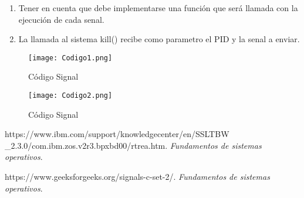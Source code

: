 \documentclass[a4paperx]{article}
\begin{document}
\begin{enumerate}
\begin{enumerate}
\item{Tener en cuenta que debe implementarse una funci\'on que ser\'a llamada con la ejecuci\'on de cada senal.}\\

\item{La llamada al sistema kill() recibe como parametro el PID y la senal
a enviar}.\\


\end{enumerate}

\begin{figure}[H]
\centering
\texttt{[image: Codigo1.png]}
\caption{C\'odigo Signal}
\end{figure}

\begin{figure}[H]
\centering
\texttt{[image: Codigo2.png]}
\caption{C\'odigo Signal}
\end{figure}



\end{enumerate}

\begin{thebibliography}{99}

 https://www.ibm.com/support/knowledgecenter/en/SSLTBW\\
\_2.3.0/com.ibm.zos.v2r3.bpxbd00/rtrea.htm. {\it Fundamentos de sistemas operativos}. 

  https://www.geeksforgeeks.org/signals-c-set-2/. {\it Fundamentos de sistemas operativos}. 

\end{thebibliography}
\end{document}
